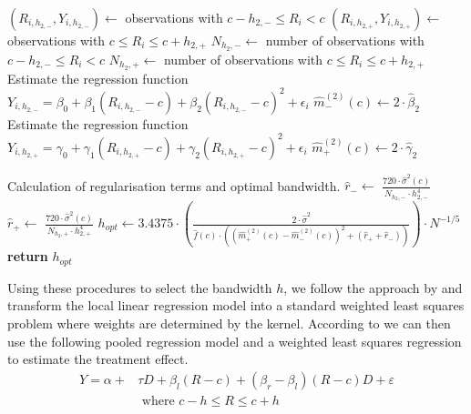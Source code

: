 \begin{algorithm}
\begin{algorithmic}[1]
		\State $(R_{i, h_{2, -}}, Y_{i, h_{2, -}}) \gets$ observations with $c-h_{2, -} \leq R_{i} < c$
		\State $(R_{i, h_{2, +}}, Y_{i, h_{2, +}}) \gets$ observations with $c \leq R_{i} \leq c+h_{2, +}$
		\State $N_{h_{2}, -} \gets$ number of observations with $c-h_{2, -} \leq R_{i} < c$
		\State $N_{h_{2}, +} \gets$ number of observations with $c \leq R_{i} \leq c+h_{2, +}$
		\State Estimate the regression function  $Y_{i, h_{2,-}} = \beta_{0} + \beta_{1} (R_{i, h_{2, -}}-c) + \beta_{2} (R_{i, h_{2, -}}-c)^{2} + \epsilon_{i}$
		\State $\widehat{m}^{(2)}_{-}(c) \gets 2 \cdot \widehat{\beta}_{2}$ {\color{blue} }
		\State Estimate the regression function  $Y_{i, h_{2,+}} = \gamma_{0} + \gamma_{1} (R_{i, h_{2, +}}-c) + \gamma_{2} (R_{i, h_{2, +}}-c)^{2} + \epsilon_{i}$
		\State $\widehat{m}^{(2)}_{+}(c) \gets 2 \cdot \widehat{\gamma}_{2}$ {\color{blue} }

		\Stepthree Calculation of regularisation terms and optimal bandwidth.
		\State $\widehat{r}_{-} \gets$ $\frac{720 \cdot \widehat{\sigma}^{2}(c)}{N_{h_{2}, -} \cdot h_{2, -}^{4}}$
		\State $\widehat{r}_{+} \gets$ $\frac{720 \cdot \widehat{\sigma}^{2}(c)}{N_{h_{2}, +} \cdot h_{2, +}^{4}}$
		\State $h_{opt} \gets 3.4375 \cdot \left(\frac{2 \cdot \widehat{\sigma}^{2}}{\widehat{f}(c) \cdot \left( \left( \widehat{m}^{(2)}_{+}(c) - \widehat{m}^{(2)}_{-}(c) \right)^{2} + \left( \widehat{r}_{+} + \widehat{r}_{-} \right) \right)}\right) \cdot N^{-1/5}$
		\State \textbf{return} $h_{opt}$
	\end{algorithmic}
\end{algorithm}

Using these procedures to select the bandwidth $h$, we follow the approach by \cite{fan_gij} and transform the local linear regression model into a standard weighted least squares problem where weights are determined by the kernel. According to \cite{lee_lemieux} we can then use the following pooled regression model and a weighted least squares regression to estimate the treatment effect.
\begin{align}
Y = \alpha + & \tau D + \beta_{l} (R-c) + (\beta_{r} - \beta_{l}) (R-c) D + \varepsilon \\
&\text{ where } c - h \leq R \leq c + h \nonumber
\label{eq: model_non_param}
\end{align}


